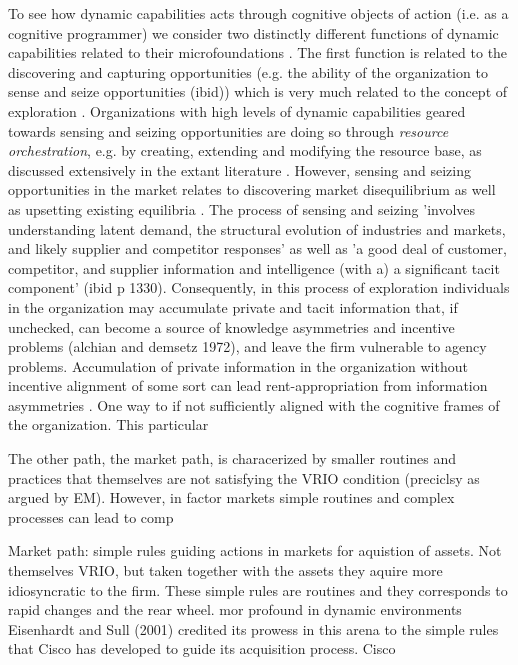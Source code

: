 To see how dynamic capabilities acts through cognitive objects of action (i.e. as a
cognitive programmer) we consider two distinctly different functions of dynamic
capabilities related to their microfoundations \citep{Teece2007}. The first function is
related to the discovering and capturing opportunities (e.g. the ability of the
organization to sense and seize opportunities (ibid)) which is very much related to the
concept of exploration \citep{March1991}. Organizations with high levels of dynamic
capabilities geared towards sensing and seizing opportunities are doing so through
\emph{resource orchestration}, e.g. by creating, extending and modifying the resource
base, as discussed extensively in the extant literature
\citep{Helfat2007,DiStefano2014,Protogerou2012,Schilke2018}. However, sensing and seizing
opportunities in the market relates to discovering market disequilibrium
\citep{Kirzner1997} as well as upsetting existing equilibria \citep{Schumpeter1934}. The
process of sensing and seizing 'involves understanding latent demand, the structural
evolution of industries and markets, and likely supplier and competitor responses'
\citep[p. 1322]{Teece2007} as well as 'a good deal of customer, competitor, and supplier
information and intelligence (with a) a significant tacit component' (ibid p
1330). Consequently, in this process of exploration individuals in the organization may
accumulate private and tacit information that, if unchecked, can become a source of
knowledge asymmetries and incentive problems (alchian and demsetz 1972), and leave the
firm vulnerable to agency problems. Accumulation of private information in the
organization without incentive alignment of some sort can lead rent-appropriation from
information asymmetries \citep{Blyler2003}. One way to  if not sufficiently aligned with the
cognitive frames of the organization. This particular





The other path, the market path, is characerized by smaller routines and practices that
themselves are not satisfying the VRIO condition (preciclsy as argued by EM). However, in
factor markets  
simple routines and complex processes can lead to comp


Market path: simple rules guiding actions in markets for aquistion of assets. Not
themselves VRIO, but taken together with the assets they aquire more idiosyncratic to the
firm. These simple rules are routines and they corresponds to rapid changes and the rear
wheel. mor profound in dynamic environments
Eisenhardt and Sull (2001) credited its prowess in this arena to the simple rules that Cisco has developed to guide its acquisition process. Cisco

